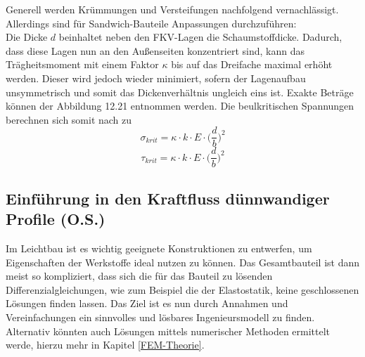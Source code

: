 \noindent Generell werden Krümmungen und Versteifungen nachfolgend vernachlässigt. Allerdings sind für Sandwich-Bauteile Anpassungen durchzuführen:\\
Die Dicke $d$ beinhaltet neben den FKV-Lagen die Schaumstoffdicke. Dadurch, dass diese Lagen nun an den Außenseiten konzentriert sind, kann das Trägheitsmoment mit einem Faktor $\kappa$ bis auf das Dreifache maximal erhöht werden. Dieser wird jedoch wieder minimiert, sofern der Lagenaufbau unsymmetrisch und somit das Dickenverhältnis ungleich eins ist. Exakte Beträge können der Abbildung 12.21 entnommen werden. Die beulkritischen Spannungen berechnen sich somit nach \cite{item1} zu
\begin{equation}
	\sigma_{krit}=\kappa\cdot k\cdot E\cdot\Big(\frac{d}{b}\Big)^{2}
\end{equation}
\begin{equation}
	\tau_{krit}=\kappa\cdot k\cdot E\cdot\Big(\frac{d}{b}\Big)^{2}
\end{equation}
\newpage

\subsection{Einführung in den Kraftfluss dünnwandiger Profile (O.S.)}\label{Trägheitsmomente}
Im Leichtbau ist es wichtig geeignete Konstruktionen zu entwerfen, um Eigenschaften der Werkstoffe ideal nutzen zu können. Das Gesamtbauteil ist dann meist so kompliziert, dass sich die für das Bauteil zu lösenden Differenzialgleichungen, wie zum Beispiel die der Elastostatik, keine geschlossenen Lösungen finden lassen. Das Ziel ist es nun durch Annahmen und Vereinfachungen ein sinnvolles und lösbares Ingenieursmodell zu finden. Alternativ könnten auch Lösungen mittels numerischer Methoden ermittelt werde, hierzu mehr in Kapitel \ref{FEM-Theorie}.

